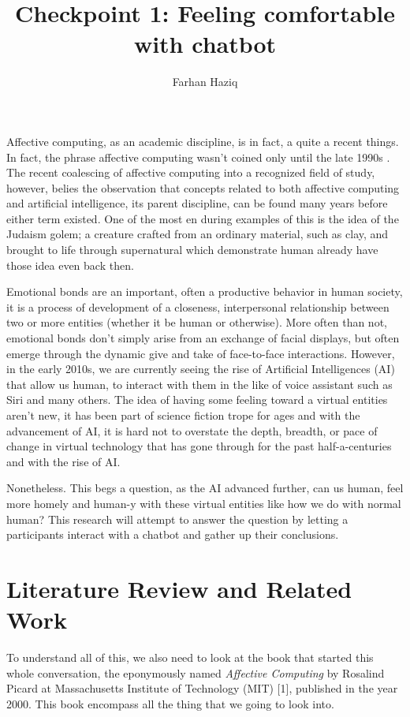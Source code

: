 \documentclass{vgtc}
\title{Checkpoint 1: Feeling comfortable with chatbot}
\author{Farhan Haziq}
\affiliation{\scriptsize Department of Computer Science \\ \textit{Colorado State University, Fort Collins, Colorado}}
\begin{document}
\maketitle
Affective computing, as an academic discipline, is in fact, a quite a recent things. In fact, the phrase affective computing wasn’t coined only until the late 1990s \cite{picard_2000}. The recent coalescing of affective computing into a recognized field of study, however, belies the observation that concepts related to both affective computing and artificial intelligence, its parent discipline, can be found many years before either term existed. One of the most en during examples of this is the idea of the Judaism golem; a creature crafted from an ordinary material, such as clay, and brought to life through supernatural which demonstrate human already have those idea even back then.

Emotional bonds are an important, often a productive behavior in human society, it is a process of development of a closeness, interpersonal relationship between two or more entities (whether it be human or otherwise). More often than not, emotional bonds don’t simply arise from an exchange of facial displays, but often emerge through the dynamic give and take of face-to-face interactions. However, in the early 2010s, we are currently seeing the rise of Artificial Intelligences (AI) that allow us human, to interact with them in the like of voice assistant such as Siri and many others. The idea of having some feeling toward a virtual entities aren’t new, it has been part of science fiction trope for ages and with the advancement of AI, it is hard not to overstate the depth, breadth, or pace of change in virtual technology that has gone through for the past half-a-centuries and with the rise of AI. 

Nonetheless. This begs a question, as the AI advanced further, can us human, feel more homely and human-y with these virtual entities like how we do with normal human? This research will attempt to answer the question by letting a participants interact with a chatbot and gather up their conclusions.


\section{Literature Review and Related Work}

To understand all of this, we also need to look at the book that started
this whole conversation, the eponymously named \emph{Affective
Computing} by Rosalind Picard at Massachusetts Institute of Technology
(MIT) {[}1{]}, published in the year 2000. This book encompass all the
thing that we going to look into.
\end{document}
